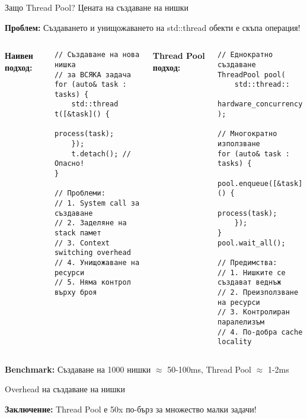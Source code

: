 \documentclass[aspectratio=169]{beamer}
\begin{document}
\begin{frame}[fragile]{Защо Thread Pool? Цената на създаване на нишки}

\textbf{Проблем:} Създаването и унищожаването на std::thread обекти е скъпа операция! \\

\begin{columns}
\textbf{Наивен подход:}
\begin{lstlisting}[basicstyle=\ttfamily\tiny]
// Създаване на нова нишка 
// за ВСЯКА задача
for (auto& task : tasks) {
    std::thread t([&task]() {
        process(task);
    });
    t.detach(); // Опасно!
}

// Проблеми:
// 1. System call за създаване
// 2. Заделяне на stack памет
// 3. Context switching overhead
// 4. Унищожаване на ресурси
// 5. Няма контрол върху броя
\end{lstlisting}

\textbf{Thread Pool подход:}
\begin{lstlisting}[basicstyle=\ttfamily\tiny]
// Еднократно създаване
ThreadPool pool(
    std::thread::
    hardware_concurrency()
);

// Многократно използване
for (auto& task : tasks) {
    pool.enqueue([&task]() {
        process(task);
    });
}
pool.wait_all();

// Предимства:
// 1. Нишките се създават веднъж
// 2. Преизползване на ресурси
// 3. Контролиран паралелизъм
// 4. По-добра cache locality
\end{lstlisting}
\end{columns}

\vspace{0.2cm}
\centering
\textbf{Benchmark:} Създаване на 1000 нишки $\approx$ 50-100ms, Thread Pool $\approx$ 1-2ms
\end{frame}

\begin{frame}{Overhead на създаване на нишки}
\begin{center}
\end{center}

\textbf{Заключение:} Thread Pool е 50x по-бърз за множество малки задачи!
\end{frame}
\end{document}
